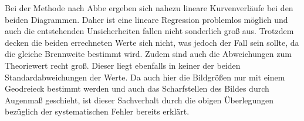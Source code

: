Bei der Methode nach Abbe ergeben sich nahezu lineare Kurvenverläufe bei den beiden Diagrammen. Daher ist eine
lineare Regression problemlos möglich und auch die entstehenden Unsicherheiten fallen nicht sonderlich groß aus.
Trotzdem decken die beiden errechneten Werte sich nicht, was jedoch der Fall sein sollte, da die gleiche Brennweite
bestimmt wird. Zudem sind auch die Abweichungen zum Theoriewert recht groß. Dieser liegt ebenfalls in keiner der beiden Standardabweichungen
der Werte.
Da auch hier die Bildgrößen nur mit einem Geodreieck bestimmt werden und auch das Scharfstellen des Bildes
durch Augenmaß geschieht, ist dieser Sachverhalt durch die obigen Überlegungen bezüglich der systematischen Fehler
bereits erklärt.

